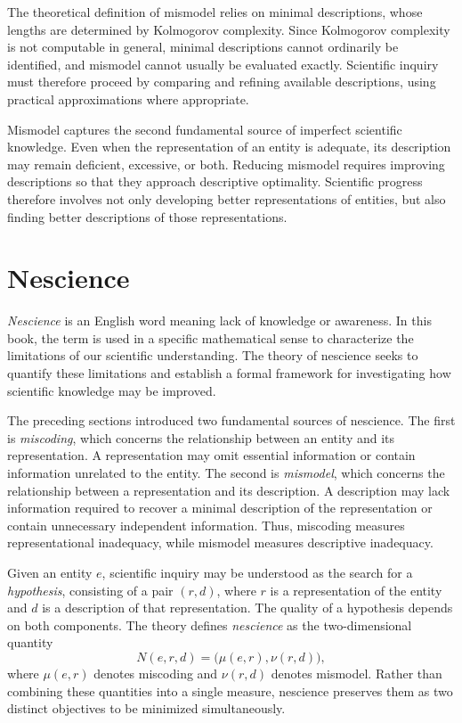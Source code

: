 The theoretical definition of mismodel relies on minimal descriptions, whose lengths are determined by Kolmogorov complexity. Since Kolmogorov complexity is not computable in general, minimal descriptions cannot ordinarily be identified, and mismodel cannot usually be evaluated exactly. Scientific inquiry must therefore proceed by comparing and refining available descriptions, using practical approximations where appropriate.

Mismodel captures the second fundamental source of imperfect scientific knowledge. Even when the representation of an entity is adequate, its description may remain deficient, excessive, or both. Reducing mismodel requires improving descriptions so that they approach descriptive optimality. Scientific progress therefore involves not only developing better representations of entities, but also finding better descriptions of those representations.

%
%

\section{Nescience}
\label{sec:ch1_nescience}

\emph{Nescience} is an English word meaning lack of knowledge or awareness. In this book, the term is used in a specific mathematical sense to characterize the limitations of our scientific understanding. The theory of nescience seeks to quantify these limitations and establish a formal framework for investigating how scientific knowledge may be improved.

The preceding sections introduced two fundamental sources of nescience. The first is \emph{miscoding}, which concerns the relationship between an entity and its representation. A representation may omit essential information or contain information unrelated to the entity. The second is \emph{mismodel}, which concerns the relationship between a representation and its description. A description may lack information required to recover a minimal description of the representation or contain unnecessary independent information. Thus, miscoding measures representational inadequacy, while mismodel measures descriptive inadequacy.

Given an entity $e$, scientific inquiry may be understood as the search for a \emph{hypothesis}, consisting of a pair $(r,d)$, where $r$ is a representation of the entity and $d$ is a description of that representation. The quality of a hypothesis depends on both components. The theory defines \emph{nescience} as the two-dimensional quantity
\[
N(e,r,d)=\bigl(\mu(e,r),\nu(r,d)\bigr),
\]
where $\mu(e,r)$ denotes miscoding and $\nu(r,d)$ denotes mismodel. Rather than combining these quantities into a single measure, nescience preserves them as two distinct objectives to be minimized simultaneously.


